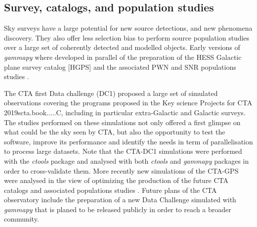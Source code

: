 \subsection{Survey, catalogs, and population studies}

Sky surveys have a large potential for new source detections, and new phenomena discovery. They also offer less selection bias to perform source population studies over a large set of coherently detected and modelled objects.
Early versions of \textit{gammapy} where developed in parallel of the preparation of the HESS Galactic plane survey catalog [HGPS]\citep {2018A&A...612A...1H} and the associated PWN and SNR populations studies \citep{2018A&A...612A...2H, 2018A&A...612A...3H}.

The CTA first Data challenge (DC1) proposed a large set of simulated observations covering the programs proposed in the Key science Projects for CTA  {2019scta.book.....C}, including in particular extra-Galactic and Galactic surveys.
The studies performed on these simulations not only offered a first glimpse on what could be the sky seen by CTA, but also the opportunity to test the software, improve its performance and identify the needs in term of parallelisation to process large datasets. Note that the CTA-DC1 simulations were performed with the \textit{ctools}  \citep{2016A&A...593A...1K} package and analysed with both \textit{ctools} and \textit{gammapy} packages in order to cross-validate them. More recently new simulations of the CTA-GPS were analysed  in the view of optimizing the production of the future CTA catalogs and associated populations studies \citep{2021arXiv210903729R}.
Future plans of the CTA observatory include the preparation of a new Data Challenge simulated with \textit{gammapy} that is planed to be released publicly in order to reach a broader community.
